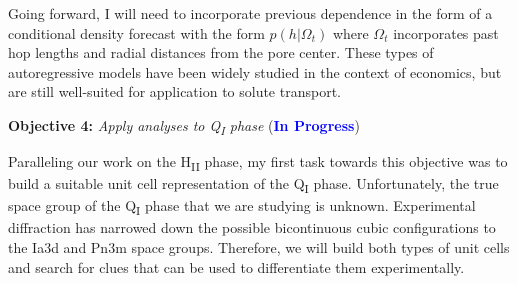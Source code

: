 \documentclass{article}
\begin{document}
  Going forward, I will need to incorporate previous dependence in the 
  form of a conditional density forecast with the form $p(h|\Omega_t)$ where
  $\Omega_t$ incorporates past hop lengths and radial distances from
  the pore center. These types of autoregressive models have been widely
  studied in the context of economics, but are still well-suited for 
  application to solute transport.~\cite{hamilton_time_1994}
  
  \noindent \textbf{\large Objective 4:} \textit{\large Apply analyses to 
  Q\textsubscript{I} phase} (\textcolor{blue}{\textbf{In Progress}})
  
  Paralleling our work on the H\textsubscript{II} phase, my first task towards
  this objective was to build a suitable unit cell representation of the 
  Q\textsubscript{I} phase. Unfortunately, the true space group of the Q\textsubscript{I} phase that we
  are studying is unknown. Experimental diffraction has narrowed down the 
  possible bicontinuous cubic configurations to the Ia3d and Pn3m space groups. 
  Therefore, we will build both types of unit cells and search for clues that
  can be used to differentiate them experimentally.
  
\end{document}
